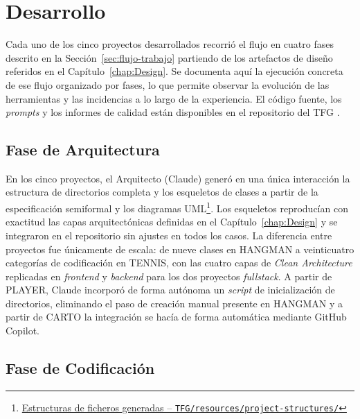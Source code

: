 
\chapter{Desarrollo} \label{chap:Development}

Cada uno de los cinco proyectos desarrollados recorrió el flujo en cuatro fases descrito en la Sección~\ref{sec:flujo-trabajo} partiendo de los artefactos de diseño referidos en el Capítulo~\ref{chap:Design}. 
Se documenta aquí la ejecución concreta de ese flujo organizado por fases, lo que permite observar la evolución de las herramientas y las incidencias a lo largo de la experiencia. 
El código fuente, los \textit{prompts} y los informes de calidad están disponibles en el repositorio del \ac{TFG} \cite{URL::TFG}.

\section{Fase de Arquitectura} \label{sec:dev-architecture}

En los cinco proyectos, el Arquitecto (Claude) generó en una única interacción la estructura de directorios completa y los esqueletos de clases a partir de la especificación semiformal y los diagramas UML\footnote{\href{https://github.com/alu0101549491/TFG-Fabian-Gonzalez-Lence/blob/main/resources/project-structures/}{Estructuras de ficheros generadas -- \texttt{TFG/resources/project-structures/}}}. Los esqueletos reproducían con exactitud las capas arquitectónicas definidas en el Capítulo~\ref{chap:Design} y se integraron en el repositorio sin ajustes en todos los casos. La diferencia entre proyectos fue únicamente de escala: de nueve clases en \ac{HANGMAN} a veinticuatro categorías de codificación en \ac{TENNIS}, con las cuatro capas de \textit{Clean Architecture} replicadas en \textit{frontend} y \textit{backend} para los dos proyectos \textit{fullstack}. A partir de \ac{PLAYER}, Claude incorporó de forma autónoma un \textit{script} de inicialización de directorios, eliminando el paso de creación manual presente en \ac{HANGMAN} y a partir de \ac{CARTO} la integración se hacía de forma automática mediante GitHub Copilot.

\section{Fase de Codificación} \label{sec:dev-coding}


